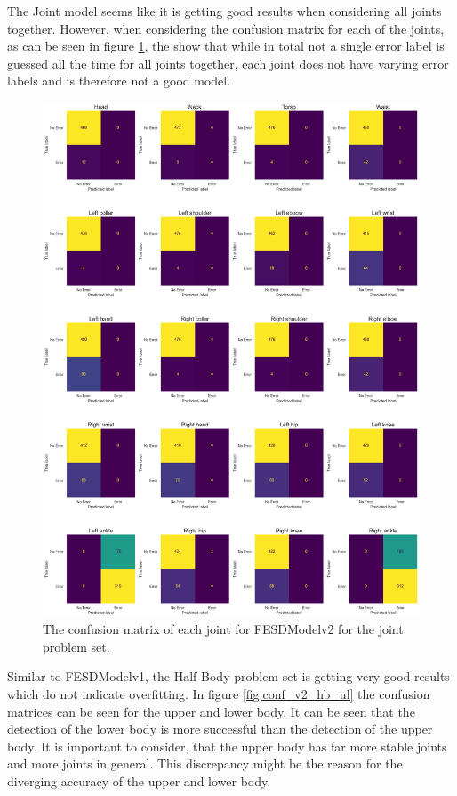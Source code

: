 The Joint model seems like it is getting good results when considering all joints together. However, when considering the confusion matrix for each of the joints, as can be seen in figure \ref{fig:conf_v2_jts}, the show that while in total not a single error label is guessed all the time for all joints together, each joint does not have varying error labels and is therefore not a good model. 

\begin{figure}[htbp]
  \centering
  \includegraphics[width=.8\linewidth]{figures/Results/v2/confusion/joints_joint.png}
  \caption[Confusion matrix of FESDModelv2 for each Joint]{The confusion matrix of each joint for FESDModelv2 for the joint problem set.}
  \label{fig:conf_v2_jts}
\end{figure}

Similar to FESDModelv1, the Half Body problem set is getting very good results which do not indicate overfitting. In figure \ref{fig:conf_v2_hb_ul} the confusion matrices can be seen for the upper and lower body. It can be seen that the detection of the lower body is more successful than the detection of the upper body. It is important to consider, that the upper body has far more stable joints and more joints in general. This discrepancy might be the reason for the diverging accuracy of the upper and lower body.

